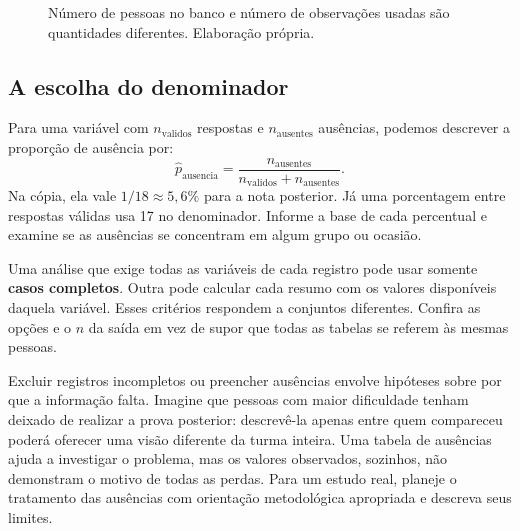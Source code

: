 \begin{figure}[H]
\centering
{}
\caption{Número de pessoas no banco e número de observações usadas são quantidades diferentes. Elaboração própria.}
\label{fig:ausentes-e-denominadores}
\end{figure}

\subsection{A escolha do denominador}

Para uma variável com $n_{\mathrm{validos}}$ respostas e $n_{\mathrm{ausentes}}$ ausências, podemos descrever a proporção de ausência por:
\[
\widehat p_{\mathrm{ausencia}}=
\frac{n_{\mathrm{ausentes}}}{n_{\mathrm{validos}}+n_{\mathrm{ausentes}}}.
\]
Na cópia, ela vale $1/18\approx5{,}6\%$ para a nota posterior. Já uma porcentagem entre respostas válidas usa 17 no denominador. Informe a base de cada percentual e examine se as ausências se concentram em algum grupo ou ocasião.

Uma análise que exige todas as variáveis de cada registro pode usar somente \textbf{casos completos}. Outra pode calcular cada resumo com os valores disponíveis daquela variável. Esses critérios respondem a conjuntos diferentes. Confira as opções e o $n$ da saída em vez de supor que todas as tabelas se referem às mesmas pessoas.

Excluir registros incompletos ou preencher ausências envolve hipóteses sobre por que a informação falta. Imagine que pessoas com maior dificuldade tenham deixado de realizar a prova posterior: descrevê-la apenas entre quem compareceu poderá oferecer uma visão diferente da turma inteira. Uma tabela de ausências ajuda a investigar o problema, mas os valores observados, sozinhos, não demonstram o motivo de todas as perdas. Para um estudo real, planeje o tratamento das ausências com orientação metodológica apropriada e descreva seus limites.

